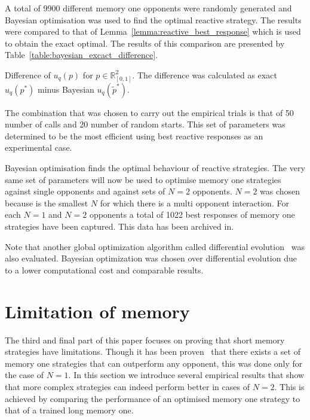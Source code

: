 \documentclass[10pt]{article}
\newcommand{\R}{\mathbb{R}}
\begin{document}
A total of 9900 different memory one opponents were randomly generated and
Bayesian optimisation was used to find the optimal reactive strategy. The
results were compared to that of Lemma~\ref{lemma:reactive_best_response} which
is used to obtain the exact optimal.  The results of this comparison are
presented by Table~\ref{table:bayesian_excact_difference}.

\begin{table}[htbp]
    \begin{center}
    
    \caption{Difference of \(u_q(p)\) for \(p \in \R_{[0, 1]} ^ 2\). The difference was
    calculated as exact \(u_q(p ^ *)\) minus Bayesian \(u_q(\tilde{p} ^ *)\).}
    \label{table:bayesian_excact_difference}
    \end{center}
\end{table}

The combination that was chosen to carry out the empirical trials is that
of 50 number of calls and 20 number of random starts. This set of parameters
was determined to be the most efficient using best reactive responses as an experimental
case.


Bayesian optimisation finds the optimal
behaviour of reactive strategies. The very same set of parameters will now be
used to optimise
memory one strategies against single opponents and against
sets of \(N=2\) opponents. \(N=2\) was chosen because is the smallest \(N\) for
which there is a multi opponent interaction. For each \(N=1\) and \(N=2\) opponents a
total of 1022 best responses of memory one strategies have been captured. This data has
been archived in.

Note that another global optimization algorithm called differential evolution~\cite{Storn1997}
was also evaluated. Bayesian optimization was
chosen over differential evolution due to a lower computational cost and
comparable results.

\section{Limitation of memory}

The third and final part of this paper focuses on proving that short memory strategies
have limitations. Though it has been proven~\cite{Press2012} that there exists a set
of memory one strategies that can outperform any opponent, this was done only for
the case of \(N=1\). In this section we introduce several empirical results that
show that more complex strategies can indeed perform better in cases of \(N=2\).
This is achieved by comparing the performance of an optimised memory one strategy
to that of a trained long memory one.
\end{document}
